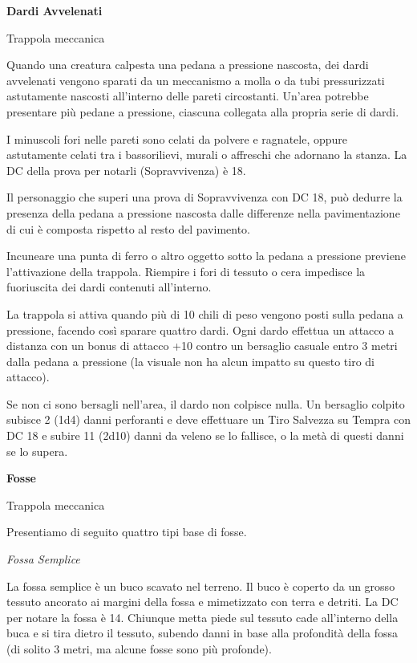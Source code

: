 \begin{multicols}{2}
\medskip

\textbf{Dardi Avvelenati}

Trappola meccanica

Quando una creatura calpesta una pedana a pressione nascosta, dei dardi avvelenati vengono sparati da un meccanismo a molla o da tubi pressurizzati astutamente nascosti all'interno delle pareti circostanti. Un'area potrebbe presentare più pedane a pressione, ciascuna collegata alla propria serie di dardi.

I minuscoli fori nelle pareti sono celati da polvere e ragnatele, oppure astutamente celati tra i bassorilievi, murali o affreschi che adornano la stanza. La DC della prova per notarli (Sopravvivenza) è 18.

Il personaggio che superi una prova di Sopravvivenza con DC 18, può dedurre la presenza della pedana a pressione nascosta dalle differenze nella pavimentazione di cui è composta rispetto al resto del pavimento.

Incuneare una punta di ferro o altro oggetto sotto la pedana a pressione previene l'attivazione della trappola. Riempire i fori di tessuto o cera impedisce la fuoriuscita dei dardi contenuti all'interno.

La trappola si attiva quando più di 10 chili di peso vengono posti sulla pedana a pressione, facendo così sparare quattro dardi. Ogni dardo effettua un attacco a distanza con un bonus di attacco +10 contro un bersaglio casuale entro 3 metri dalla pedana a pressione (la visuale non ha alcun impatto su questo tiro di attacco).

Se non ci sono bersagli nell'area, il dardo non colpisce nulla. Un bersaglio colpito subisce 2 (1d4) danni perforanti e deve effettuare un Tiro Salvezza su Tempra con DC 18 e subire 11 (2d10) danni da veleno se lo fallisce, o la metà di questi danni se lo supera.

\medskip

\textbf{Fosse}

Trappola meccanica

Presentiamo di seguito quattro tipi base di fosse.

\medskip

\emph{Fossa Semplice}

La fossa semplice è un buco scavato nel terreno. Il buco è coperto da un grosso tessuto ancorato ai margini della fossa e mimetizzato con terra e detriti.
La DC per notare la fossa è 14. Chiunque metta piede sul tessuto cade all'interno della buca e si tira dietro il tessuto, subendo danni in base alla profondità della fossa (di solito 3 metri, ma alcune fosse sono più profonde).


\end{multicols}
